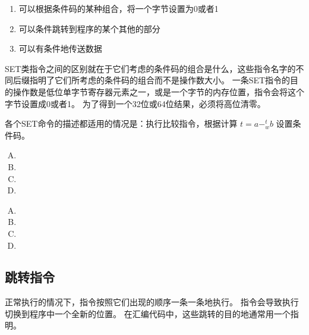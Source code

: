 {{        \begin{enumerate}
            \item 可以根据条件码的某种组合，将一个字节设置为0或者1
            \item 可以条件跳转到程序的某个其他的部分
            \item 可以有条件地传送数据
        \end{enumerate}

        SET类指令之间的区别就在于它们考虑的条件码的组合是什么，这些指令名字的不同后缀指明了它们所考虑的条件码的组合而不是操作数大小。
        一条SET指令的目的操作数是低位单字节寄存器元素之一，或是一个字节的内存位置，指令会将这个字节设置成0或者1。
        为了得到一个32位或64位结果，必须将高位清零。

        各个SET命令的描述都适用的情况是：执行比较指令，根据计算 $t = a -^t_w b$ 设置条件码。

        \begin{practicec}
            \begin{enumerate}[A.]
                \item {}
                \item {}
                \item {}
                \item {}
            \end{enumerate}
        \end{practicec}

        \begin{practicec}
            \begin{enumerate}[A.]
                \item {}
                \item {}
                \item {}
                \item {}
            \end{enumerate}
        \end{practicec}
    }

    \subsection{跳转指令}
    {
        正常执行的情况下，指令按照它们出现的顺序一条一条地执行。
        指令会导致执行切换到程序中一个全新的位置。
        在汇编代码中，这些跳转的目的地通常用一个指明。

}}

